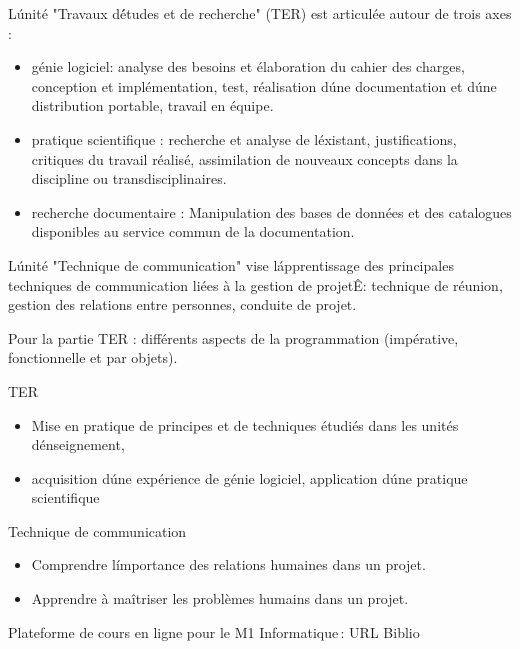 {
L\'unité "Travaux d\'études et de recherche" (TER) est articulée autour de trois axes :
\begin{itemize}
\item génie logiciel: analyse des besoins et élaboration du cahier des charges, conception et implémentation, test, réalisation d\'une documentation et d\'une distribution portable, travail en équipe. 
\item pratique scientifique : recherche et analyse de l\'existant, justifications, critiques du travail réalisé, assimilation de nouveaux concepts dans la discipline ou transdisciplinaires.
\item recherche documentaire : Manipulation des bases de données et des catalogues disponibles au service commun de la documentation.
\end{itemize}
L\'unité "Technique de communication" vise l\'apprentissage des principales techniques de communication liées à la gestion de projetÊ: technique de réunion, gestion des relations entre personnes, conduite de projet.
} 
{Pour la partie TER : différents aspects de la programmation (impérative, fonctionnelle et par objets).
} 
{\begin{itemize}
\ObjItem TER
\begin{itemize}
\item Mise en pratique de principes et de techniques étudiés dans les unités d\'enseignement,
\item acquisition d\'une expérience de génie logiciel, application d\'une pratique scientifique
\end{itemize}
\ObjItem Technique de communication
\begin{itemize}
\item Comprendre l\'importance des relations humaines dans un projet.
\item Apprendre à maîtriser les problèmes humains dans un projet.
\end{itemize}
\end{itemize} 
} 
{Plateforme de cours en ligne pour le M1 Informatique\,: URL} 
{Biblio} 
 
